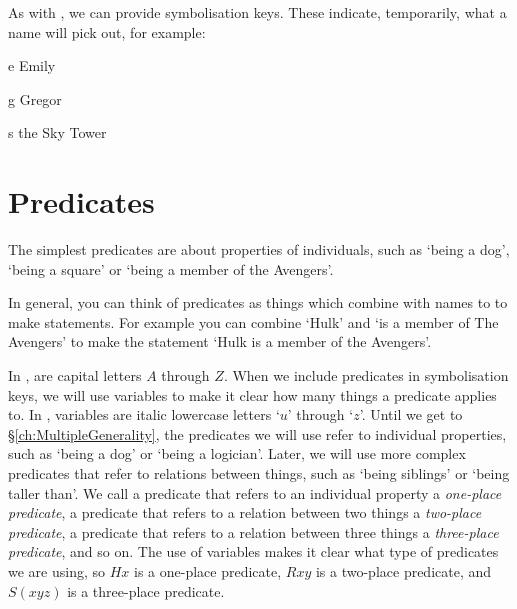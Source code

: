 \documentclass[PHIL101-Textbook.tex]{subfiles}
\begin{document}
As with \tfl, we can provide symbolisation keys.
These indicate, temporarily, what a name will pick out, for example: 
	\begin{ekey}
		\item[e] Emily
		\item[g] Gregor
		\item[s] the Sky Tower                  
	\end{ekey}



  \section{Predicates}

  \begin{center}
  \href{https://youtu.be/WsosRIioEgQ}
  {}
\end{center}
The simplest predicates are about properties of individuals, such as `being a dog', `being a square' or `being a member of the Avengers'. 

In general, you can think of predicates as things which combine with names to to make  statements.
For example you can combine `Hulk' and `is a member of The Avengers' to make the statement `Hulk is a member of the Avengers'.

In \pl,  are capital letters $A$ through $Z$. When we include predicates in symbolisation keys, we will use variables to make it clear how many things a predicate applies to. In \pl, variables are italic lowercase letters `$u$' through `$z$'.
Until we get to \S\ref{ch:MultipleGenerality}, the predicates we will use refer to individual properties, such as `being a dog' or `being a logician'.
Later, we will use more complex predicates that refer to relations between things, such as `being siblings' or `being taller than'.
We call a predicate that refers to an individual property a \emph{one-place predicate}, a predicate that refers to a relation between two things a \emph{two-place predicate}, a predicate that refers to a relation between three things a \emph{three-place predicate}, and so on.
The use of variables makes it clear what type of predicates we are using, so $H x $ is a one-place predicate, $R xy $ is a two-place predicate, and $S(xyz)$ is a three-place predicate.

\end{document}
